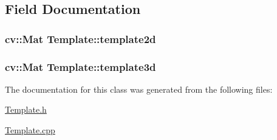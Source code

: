 \subsection{Field Documentation}
\hypertarget{classTemplate_a65d3e446fb6ac165be19da2d747e85ed}{
\subsubsection[{template2d}]{\setlength{\rightskip}{0pt plus 5cm}cv\-::\-Mat Template\-::template2d}}\label{classTemplate_a65d3e446fb6ac165be19da2d747e85ed}
\hypertarget{classTemplate_a27b16dc049359b1ac3ee24b08841ba56}{
\subsubsection[{template3d}]{\setlength{\rightskip}{0pt plus 5cm}cv\-::\-Mat Template\-::template3d}}\label{classTemplate_a27b16dc049359b1ac3ee24b08841ba56}


The documentation for this class was generated from the following files\-:\begin{DoxyCompactItemize}
\item 
\hyperlink{Template_8h}{Template.\-h}\item 
\hyperlink{Template_8cpp}{Template.\-cpp}\end{DoxyCompactItemize}
